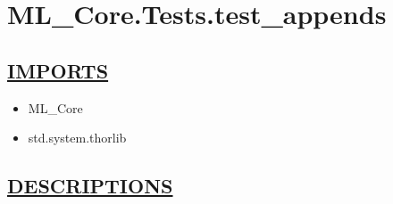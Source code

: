 \chapter*{ML\_Core.Tests.test\_appends}
\hypertarget{ecldoc:toc:ML_Core.Tests.test_appends}{}

\section*{\underline{IMPORTS}}
\begin{itemize}
\item ML\_Core
\item std.system.thorlib
\end{itemize}

\section*{\underline{DESCRIPTIONS}}
